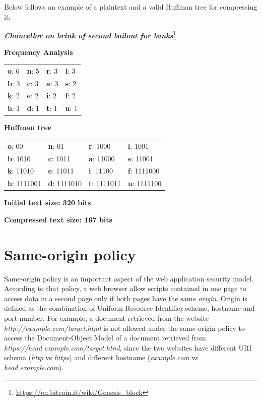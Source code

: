 Below follows an example of a plaintext and a valid Huffman tree for compressing
it:

\bigskip \centerline{\textit{\textbf{Chancellor on brink of second bailout for
banks}}\footnote{\url{https://en.bitcoin.it/wiki/Genesis_block}}}

\bigskip \centerline{\textbf{Frequency Analysis}}

\begin{table}[H] \centering \begin{tabular}{ | l | l | l | l | } \hline
\textbf{o}: 6 & \textbf{n}: 5 & \textbf{r}: 3 & \textbf{l}: 3 \\ \textbf{b}: 3 &
\textbf{c}: 3 & \textbf{a}: 3 & \textbf{s}: 2 \\ \textbf{k}: 2 & \textbf{e}: 2 &
\textbf{i}: 2 & \textbf{f}: 2 \\ \textbf{h}: 1 & \textbf{d}: 1 & \textbf{t}: 1 &
\textbf{u}: 1 \\ \hline \end{tabular} \end{table}

\centerline{\textbf{Huffman tree}}

\begin{table}[H] \centering \begin{tabular}{ | l | l | l | l | } \hline
\textbf{o}: 00 & \textbf{n}: 01 & \textbf{r}: 1000 & \textbf{l}: 1001 \\
\textbf{b}: 1010 & \textbf{c}: 1011 & \textbf{a}: 11000 & \textbf{s}: 11001 \\
\textbf{k}: 11010 & \textbf{e}: 11011 & \textbf{i}: 11100 & \textbf{f}: 1111000
\\ \textbf{h}: 1111001 & \textbf{d}: 1111010 & \textbf{t}: 1111011 & \textbf{u}:
1111100 \\ \hline \end{tabular} \end{table}

\centerline{\textbf{Initial text size: 320 bits}} \centerline{\textbf{Compressed
text size: 167 bits}}

\section{Same-origin policy}\label{sec:sameorigin}

Same-origin policy is an important aspect of the web application security model.
According to that policy, a web browser allow scripts contained in one page to
access data in a second page only if both pages have the same \textit{origin}.
Origin is defined as the combination of Uniform Resource Identifier scheme,
hostname and port number. For example, a document retrieved from the website
\textit{http://example.com/target.html} is not allowed under the same-origin
policy to access the Document-Object Model of a document retrieved from
\textit{https://head.example.com/target.html}, since the two websites have
different URI schema (\textit{http} vs \textit{https}) and different hostname
(\textit{example.com} vs \textit{head.example.com}).

